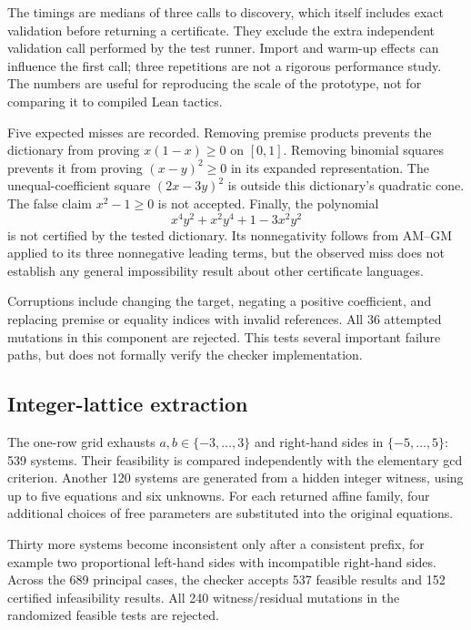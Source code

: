 \documentclass[11pt,a4paper]{article}
\begin{document}
\begin{center}
\small

\end{center}

The timings are medians of three calls to discovery, which itself includes exact validation before returning a certificate. They exclude the extra independent validation call performed by the test runner. Import and warm-up effects can influence the first call; three repetitions are not a rigorous performance study. The numbers are useful for reproducing the scale of the prototype, not for comparing it to compiled Lean tactics.

Five expected misses are recorded. Removing premise products prevents the dictionary from proving $x(1-x)\geq0$ on $[0,1]$. Removing binomial squares prevents it from proving $(x-y)^2\geq0$ in its expanded representation. The unequal-coefficient square $(2x-3y)^2$ is outside this dictionary's quadratic cone. The false claim $x^2-1\geq0$ is not accepted. Finally, the polynomial
\[
x^4y^2+x^2y^4+1-3x^2y^2
\]
is not certified by the tested dictionary. Its nonnegativity follows from AM--GM applied to its three nonnegative leading terms, but the observed miss does not establish any general impossibility result about other certificate languages.

Corruptions include changing the target, negating a positive coefficient, and replacing premise or equality indices with invalid references. All 36 attempted mutations in this component are rejected. This tests several important failure paths, but does not formally verify the checker implementation.

\subsection{Integer-lattice extraction}

The one-row grid exhausts $a,b\in\{-3,\ldots,3\}$ and right-hand sides in $\{-5,\ldots,5\}$: 539 systems. Their feasibility is compared independently with the elementary gcd criterion. Another 120 systems are generated from a hidden integer witness, using up to five equations and six unknowns. For each returned affine family, four additional choices of free parameters are substituted into the original equations.

Thirty more systems become inconsistent only after a consistent prefix, for example two proportional left-hand sides with incompatible right-hand sides. Across the 689 principal cases, the checker accepts 537 feasible results and 152 certified infeasibility results. All 240 witness/residual mutations in the randomized feasible tests are rejected.
\end{document}
